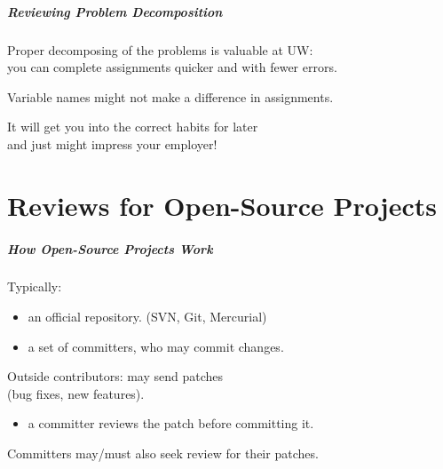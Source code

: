 \begin{frame}
\frametitle{Reviewing Problem Decomposition}
\begin{changemargin}{1cm}
Proper decomposing of the problems is valuable at UW: \\
\quad you can complete assignments quicker and with fewer errors. 

Variable names might not make a difference in assignments. 

It will get you into the correct habits for later\\
\quad and just might impress your employer!

\end{changemargin}
\end{frame}



\part{Reviews for Open-Source Projects}
\frame{\partpage}

\begin{frame}
\frametitle{How Open-Source Projects Work}

\begin{changemargin}{1cm}
Typically: 

\begin{itemize}
\item an official repository. (SVN, Git, Mercurial)\\[1em]
\item a set of committers, who may commit changes.\\[1em]
\end{itemize}

Outside contributors: may send patches \\ \qquad (bug fixes, new features).
\begin{itemize}
\item a committer reviews the patch before committing it.
\end{itemize}

Committers may/must also seek review for their patches.
\end{changemargin}
\end{frame}


